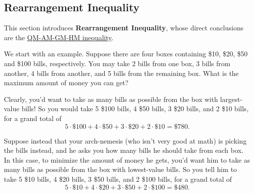 \documentclass[
	12pt, %
	fleqn, %
	a4paper, %
]{LegrandOrangeBook}
\begin{document}
\subsection{Rearrangement Inequality}
This section introduces \textbf{Rearrangement Inequality}, whose direct conclusions are the \href{https://en.wikipedia.org/wiki/QM-AM-GM-HM_Inequalities}{QM-AM-GM-HM inequality}.

We start with an example. Suppose there are four boxes containing \$10, \$20, \$50 and \$100 bills, respectively. You may take 2 bills from one box, 3 bills from another, 4 bills from another, and 5 bills from the remaining box. What is the maximum amount of money you can get?

Clearly, you’d want to take as many bills as possible from the box with largest-value bills! So you would take 5 \$100 bills, 4 \$50 bills, 3 \$20 bills, and 2 \$10 bills, for a grand total of
\begin{equation}\label{eq4.3}
5 \cdot \$100 + 4 \cdot \$50 + 3 \cdot \$20 + 2 \cdot \$10 = \$780.
\end{equation}

Suppose instead that your arch-nemesis (who isn't very good at math) is picking the bills instead, and he asks you how many bills he should take from each box. In this case, to minimize the amount of money he gets, you’d want him to take as many bills as possible from the box with lowest-value bills. So you tell him to take 5 \$10 bills, 4 \$20 bills, 3 \$50 bills, and 2 \$100 bills, for a grand total of
\begin{equation}\label{eq4.4}
5 \cdot \$10 + 4 \cdot \$20 + 3 \cdot \$50 + 2 \cdot \$100 = \$480.
\end{equation}
\end{document}
